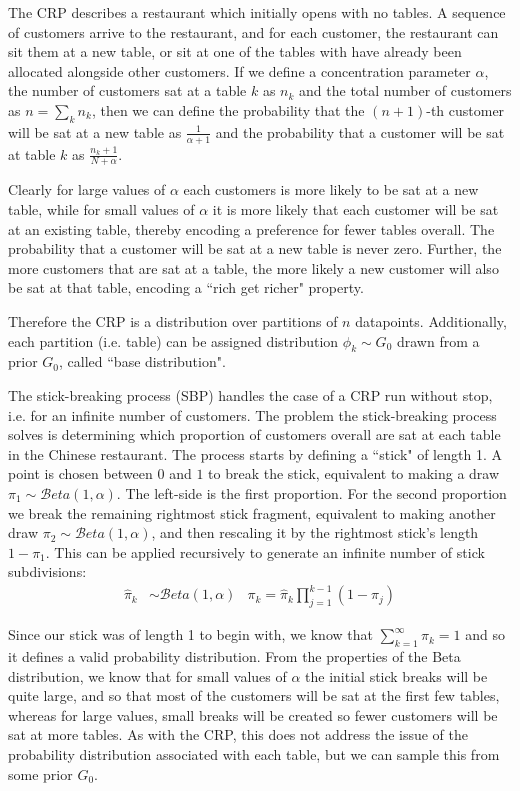 The CRP\cite{Neal2000} describes a restaurant which initially opens with no tables. A sequence of customers arrive to the restaurant, and for each customer, the restaurant can sit them at a new table, or sit at one of the tables with have already been allocated alongside other customers. If we define a concentration parameter $\alpha$, the number of customers sat at a table $k$ as $n_k$ and the total number of customers as $n = \sum_k n_k$, then we can define the probability that the $(n+1)$-th customer will be sat at a new table as $\frac{1}{\alpha + 1}$ and the probability that a customer will be sat at table $k$ as $\frac{n_k + 1}{N + \alpha}$. 

Clearly for large values of $\alpha$ each customers is more likely to be sat at a new table, while for small values of $\alpha$ it is more likely that each customer will be sat at an existing table, thereby encoding a preference for fewer tables overall. The probability that a customer will be sat at a new table is never zero. Further, the more customers that are sat at a table, the more likely a new customer will also be sat at that table, encoding a ``rich get richer" property.

Therefore the CRP is a distribution over partitions of $n$ datapoints. Additionally, each  partition (i.e. table) can be assigned distribution $\phi_k \sim G_0$ drawn from a prior $G_0$, called ``base distribution".

The stick-breaking process (SBP) handles the case of a CRP run without stop, i.e. for an infinite number of customers. The problem the stick-breaking process solves is determining which proportion of customers overall are sat at each table in the Chinese restaurant. The process starts by defining a ``stick" of length 1. A point is chosen between $0$ and $1$ to break the stick, equivalent to making a draw $\pi_1 \sim \mathcal{B}eta\left(1, \alpha\right)$. The left-side is the first proportion. For the second proportion we break the remaining rightmost stick fragment, equivalent to making another draw $\pi_2 \sim \mathcal{B}eta\left(1, \alpha\right)$, and then rescaling it by the rightmost stick's length $1-\pi_1$. This can be applied recursively to generate an infinite number of stick subdivisions:
\begin{align}
\hat{\pi}_k & \sim \mathcal{B}eta\left(1, \alpha\right) & \pi_k = \hat{\pi}_k \prod_{j=1}^{k-1} (1 - \pi_j)
\end{align}

Since our stick was of length 1 to begin with, we know that $\sum_{k=1}^{\infty} \pi_k = 1$ and so it defines a valid probability distribution. From the properties of the Beta distribution, we know that for small values of $\alpha$ the initial stick breaks will be quite large, and so that most of the customers will be sat at the first few tables, whereas for large values, small breaks will be created so fewer customers will be sat at more tables. As with the CRP, this does not address the issue of the probability distribution associated with each table, but we can sample this from some prior $G_0$.

